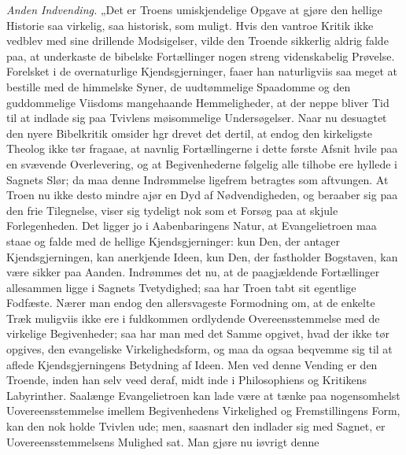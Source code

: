 \documentclass[12pt,a4paper]{book}
\begin{document}
\emph{Anden Indvending.} „Det er Troens umiskjendelige Opgave at gjøre den
hellige Historie saa virkelig, saa historisk, som muligt. Hvis den vantroe
Kritik ikke vedblev med sine drillende Modsigelser, vilde den Troende sikkerlig
aldrig falde paa, at underkaste de bibelske Fortællinger nogen streng
videnskabelig Prøvelse. Forelsket i de overnaturlige Kjendsgjerninger, faaer han
naturligviis saa meget at bestille med de himmelske Syner, de uudtømmelige
Spaadomme og den guddommelige Viisdoms mangehaande Hemmeligheder, at der neppe
bliver Tid til at indlade sig paa Tvivlens møisommelige Undersøgelser. Naar nu
desuagtet den nyere Bibelkritik omsider
hgr drevet det dertil, at endog den kirkeligste Theolog ikke tør fragaae, at
navnlig Fortællingerne i dette første Afsnit hvile paa en svævende Overlevering,
og at Begivenhederne følgelig alle tilhobe ere hyllede i Sagnets Slør; da maa
denne Indrømmelse ligefrem betragtes som aftvungen. At Troen nu ikke desto
mindre
ajør en Dyd af Nødvendigheden, og beraaber sig paa den frie Tilegnelse, viser
sig tydeligt nok som et Forsøg paa at skjule Forlegenheden. Det ligger jo i
Aabenbaringens Natur, at Evangelietroen maa staae og falde med de hellige
Kjendsgjerninger: kun Den, der antager Kjendsgjerningen, kan anerkjende Ideen,
kun Den, der fastholder Bogstaven, kan være sikker paa Aanden. Indrømmes det nu,
at de paagjældende Fortællinger allesammen ligge i Sagnets Tvetydighed; saa har
Troen tabt sit egentlige Fodfæste. Nærer man endog den allersvageste Formodning
om, at de enkelte Træk muligviis ikke ere i fuldkommen ordlydende
Overeensstemmelse med de virkelige Begivenheder; saa har man med det Samme
opgivet, hvad der ikke tør opgives, den evangeliske Virkelighedsform, og maa da
ogsaa beqvemme sig til at aflede Kjendsgjerningens Betydning af Ideen. Men ved
denne Vending er den Troende, inden han selv veed deraf, midt inde i
Philosophiens og Kritikens Labyrinther. Saalænge Evangelietroen kan lade være at
tænke paa nogensomhelst Uovereensstemmelse imellem Begivenhedens Virkelighed og
Fremstillingens Form, kan den nok holde Tvivlen ude; men, saasnart den indlader
sig med Sagnet, er Uovereensstemmelsens Mulighed sat. Man gjøre nu iøvrigt denne
\end{document}
